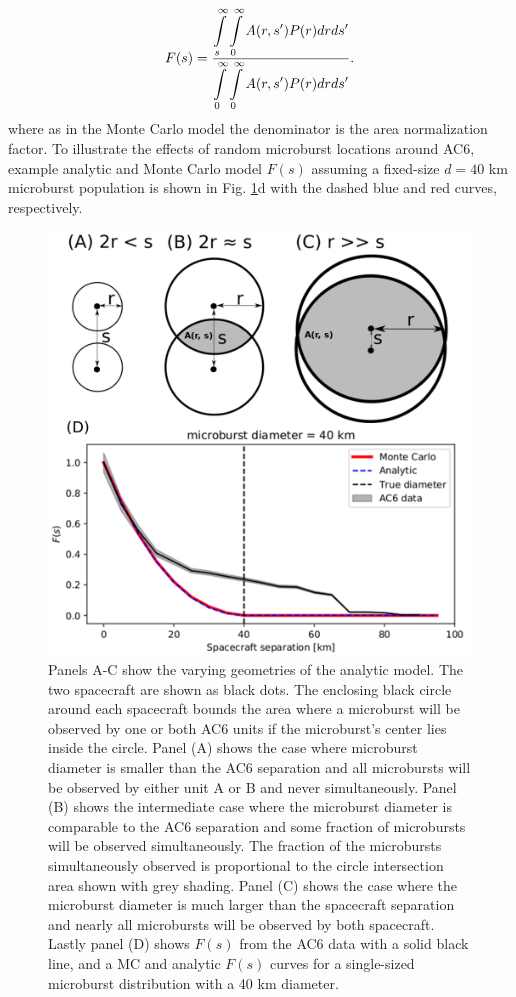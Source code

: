 \documentclass[draft]{agujournal2019}
\begin{document}
\begin{equation} \label{analytic_integral}
F(s) = \frac{\displaystyle\int\displaylimits_{s}^{\infty} \displaystyle\int\displaylimits_0^{\infty} A(r, s') P(r) dr ds'}{\displaystyle\int\displaylimits_{0}^{\infty} \displaystyle\int\displaylimits_0^{\infty} A(r, s') P(r) dr ds'} .
\end{equation} where as in the Monte Carlo model the denominator is the area normalization factor. To illustrate the effects of random microburst locations around AC6, example analytic and Monte Carlo model $F(s)$ assuming a fixed-size $d = 40$ km microburst population is shown in Fig. \ref{fig5}d with the dashed blue and red curves, respectively.

\begin{figure}
\includegraphics[width=\textwidth]{fig5.png}
\caption{Panels A-C show the varying geometries of the analytic model. The two spacecraft are shown as black dots. The enclosing black circle around each spacecraft bounds the area where a microburst will be observed by one or both AC6 units if the microburst's center lies inside the circle. Panel (A) shows the case where microburst diameter is smaller than the AC6 separation and all microbursts will be observed by either unit A or B and never simultaneously. Panel (B) shows the intermediate case where the microburst diameter is comparable to the AC6 separation and some fraction of microbursts will be observed simultaneously. The fraction of the microbursts simultaneously observed is proportional to the circle intersection area shown with grey shading. Panel (C) shows the case where the microburst diameter is much larger than the spacecraft separation and nearly all microbursts will be observed by both spacecraft. Lastly panel (D) shows $F(s)$ from the AC6 data with a solid black line, and a MC and analytic $F(s)$ curves for a single-sized microburst distribution with a 40 km diameter.} 
\label{fig5}
\end{figure}
\end{document}
